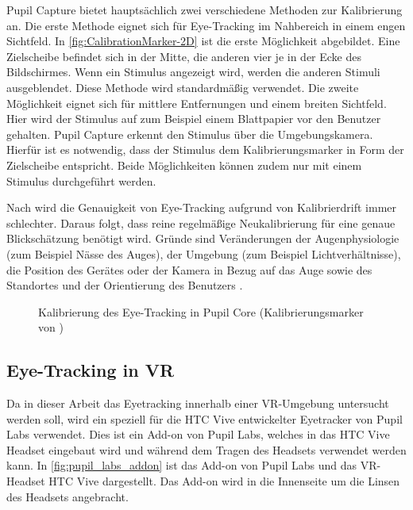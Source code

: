 Pupil Capture bietet hauptsächlich zwei verschiedene Methoden zur Kalibrierung an. Die erste Methode eignet sich für Eye-Tracking im Nahbereich in einem engen Sichtfeld. In \autoref{fig:CalibrationMarker-2D} ist die erste Möglichkeit abgebildet. Eine Zielscheibe befindet sich in der Mitte, die anderen vier je in der Ecke des Bildschirmes. Wenn ein Stimulus angezeigt wird, werden die anderen Stimuli ausgeblendet. Diese Methode wird standardmäßig verwendet. Die zweite Möglichkeit eignet sich für mittlere Entfernungen und einem breiten Sichtfeld. Hier wird der Stimulus auf zum Beispiel einem Blattpapier vor den Benutzer gehalten. Pupil Capture erkennt den Stimulus über die Umgebungskamera. Hierfür ist es notwendig, dass der Stimulus dem Kalibrierungsmarker in Form der Zielscheibe entspricht. Beide Möglichkeiten können zudem nur mit einem Stimulus durchgeführt werden. \cite{PupilLabsCalib}

Nach \citeauthor{Lander.2018} wird die Genauigkeit von Eye-Tracking aufgrund von Kalibrierdrift immer schlechter. Daraus folgt, dass reine regelmäßige Neukalibrierung für eine genaue Blickschätzung benötigt wird. \cite{Lander.2018} Gründe sind Veränderungen der Augenphysiologie (zum Beispiel Nässe des Auges), der Umgebung (zum Beispiel Lichtverhältnisse), die Position des Gerätes oder der Kamera in Bezug auf das Auge sowie des Standortes und der Orientierung des Benutzers \cite{Cerrolaza.2012}.


\begin{figure}[!htbp]
	\centering
	\caption[Kalibrierung des Eye-Tracking in Pupil Core]{Kalibrierung des Eye-Tracking in Pupil Core (Kalibrierungsmarker von \cite{PupilLabsCalibMarker})}
	\label{fig:CalibrationMarker-2D}
\end{figure}

\subsection{Eye-Tracking in VR}
Da in dieser Arbeit das Eyetracking innerhalb einer \ac{VR}-Umgebung untersucht werden soll, wird ein speziell für die HTC Vive entwickelter Eyetracker von Pupil Labs verwendet. Dies ist ein Add-on von Pupil Labs, welches in das HTC Vive Headset eingebaut wird und während dem Tragen des Headsets verwendet werden kann. In \autoref{fig:pupil_labs_addon} ist das Add-on von Pupil Labs und das \ac{VR}-Headset HTC Vive dargestellt. Das Add-on wird in die Innenseite um die Linsen des Headsets angebracht. 


